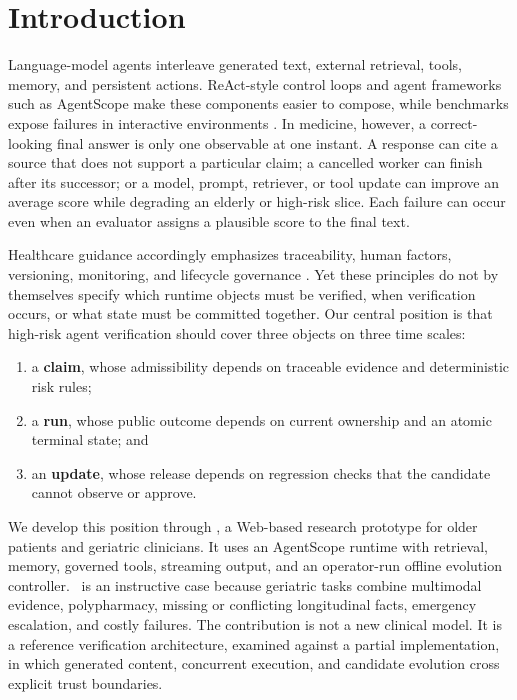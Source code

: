 \section{Introduction}
\label{sec:introduction}

Language-model agents interleave generated text, external retrieval, tools,
memory, and persistent actions.  ReAct-style control loops
\citep{yao2023react} and agent frameworks such as AgentScope
\citep{gao2024agentscope} make these components easier to compose, while
benchmarks expose failures in interactive environments
\citep{liu2024agentbench}.  In medicine, however, a correct-looking final
answer is only one observable at one instant.  A response can cite a source
that does not support a particular claim; a cancelled worker can finish after
its successor; or a model, prompt, retriever, or tool update can improve an
average score while degrading an elderly or high-risk slice.  Each failure can
occur even when an evaluator assigns a plausible score to the final text.

Healthcare guidance accordingly emphasizes traceability, human factors,
versioning, monitoring, and lifecycle governance
\citep{vasey2022decide,liu2020consortai,lekadir2025futureai}.  Yet these
principles do not by themselves specify which runtime objects must be
verified, when verification occurs, or what state must be committed together.
Our central position is that high-risk agent verification should cover three
objects on three time scales:
\begin{enumerate}[leftmargin=*,nosep]
    \item a \textbf{claim}, whose admissibility depends on traceable evidence
    and deterministic risk rules;
    \item a \textbf{run}, whose public outcome depends on current ownership and
    an atomic terminal state; and
    \item an \textbf{update}, whose release depends on regression checks that
    the candidate cannot observe or approve.
\end{enumerate}

We develop this position through \system, a Web-based research prototype for
older patients and geriatric clinicians.  It uses an AgentScope runtime with
retrieval, memory, governed tools, streaming output, and an operator-run
offline evolution controller.  \system\ is an instructive case because
geriatric tasks combine multimodal evidence, polypharmacy, missing or
conflicting longitudinal facts, emergency escalation, and costly failures.
The contribution is not a new clinical model.  It is a reference verification
architecture, examined against a partial implementation, in which generated
content, concurrent execution, and candidate evolution cross explicit trust
boundaries.


